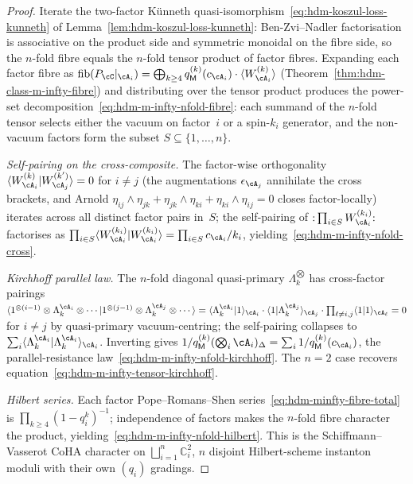 \begin{proof}
Iterate the two-factor K\"unneth
quasi-isomorphism~\eqref{eq:hdm-koszul-loss-kunneth} of
Lemma~\ref{lem:hdm-koszul-loss-kunneth}: Ben-Zvi--Nadler
factorisation is associative on the product side and symmetric
monoidal on the fibre side, so the $n$-fold fibre equals the
$n$-fold tensor product of factor fibres. Expanding each factor
fibre as $\mathrm{fib}(P_\cC|_{\cA_i}) = \bigoplus_{k\geq 4}
q_\mathsf M^{(k)}(c_{\cA_i})\cdot\langle W^{(k)}_{\cA_i}\rangle$
(Theorem~\ref{thm:hdm-class-m-infty-fibre}) and distributing over
the tensor product produces the power-set
decomposition~\eqref{eq:hdm-m-infty-nfold-fibre}: each summand of
the $n$-fold tensor selects either the vacuum on factor~$i$ or a
spin-$k_i$ generator, and the non-vacuum factors form the subset
$S\subseteq\{1,\ldots,n\}$.

\emph{Self-pairing on the cross-composite.} The factor-wise
orthogonality $\langle W^{(k)}_{\cA_i}|W^{(k')}_{\cA_j}\rangle = 0$
for $i\neq j$ (the augmentations $\epsilon_{\cA_j}$ annihilate the
cross brackets, and Arnold
$\eta_{ij}\wedge\eta_{jk}+\eta_{jk}\wedge\eta_{ki}
+\eta_{ki}\wedge\eta_{ij}=0$ closes factor-locally) iterates across
all distinct factor pairs in~$S$; the self-pairing of
${:}\prod_{i\in S}W^{(k_i)}_{\cA_i}{:}$ factorises as $\prod_{i\in
S}\langle W^{(k_i)}_{\cA_i}|W^{(k_i)}_{\cA_i}\rangle
=\prod_{i\in S}c_{\cA_i}/k_i$, yielding~\eqref{eq:hdm-m-infty-nfold-cross}.

\emph{Kirchhoff parallel law.} The $n$-fold diagonal
quasi-primary $\Lambda_k^{\bigotimes}$ has cross-factor pairings
$\langle 1^{\otimes(i-1)}\otimes\Lambda_k^{\cA_i}\otimes\cdots|
1^{\otimes(j-1)}\otimes\Lambda_k^{\cA_j}\otimes\cdots\rangle
= \langle\Lambda_k^{\cA_i}|1\rangle_{\cA_i}\cdot
\langle 1|\Lambda_k^{\cA_j}\rangle_{\cA_j}\cdot\prod_{\ell\neq i,j}
\langle 1|1\rangle_{\cA_\ell} = 0$ for $i\neq j$ by quasi-primary
vacuum-centring; the self-pairing collapses to
$\sum_i\langle\Lambda_k^{\cA_i}|\Lambda_k^{\cA_i}\rangle_{\cA_i}$.
Inverting gives $1/q_\mathsf M^{(k)}(\bigotimes_i\cA_i)_\Delta
=\sum_i 1/q_\mathsf M^{(k)}(c_{\cA_i})$, the parallel-resistance
law~\eqref{eq:hdm-m-infty-nfold-kirchhoff}. The $n=2$ case recovers
equation~\eqref{eq:hdm-m-infty-tensor-kirchhoff}.

\emph{Hilbert series.} Each factor Pope--Romans--Shen
series~\eqref{eq:hdm-minfty-fibre-total} is $\prod_{k\geq
4}(1-q_i^k)^{-1}$; independence of factors makes the $n$-fold fibre
character the product, yielding~\eqref{eq:hdm-m-infty-nfold-hilbert}.
This is the Schiffmann--Vasserot CoHA character on
$\bigsqcup_{i=1}^n\mathbb C^2_i$, $n$ disjoint Hilbert-scheme
instanton moduli with their own $(q_i)$ gradings.


\end{proof}
